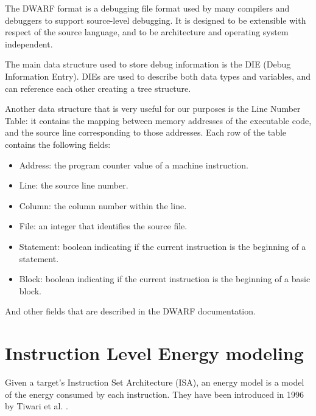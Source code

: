 The DWARF format \cite{dwarf} is a debugging file format used by many compilers and debuggers to support source-level debugging. It is designed to be extensible with respect of the source language, and to be architecture and operating system independent. \par
The main data structure used to store debug information is the DIE (Debug Information Entry). DIEs are used to describe both data types and variables, and can reference each other creating a tree structure. \par
Another data structure that is very useful for our purposes is the Line Number Table: it contains the mapping between memory addresses of the executable code, and the source line corresponding to those addresses.\newline
Each row of the table contains the following fields:
\begin{itemize}
\item Address: the program counter value of a machine instruction.
\item Line: the source line number.
\item Column: the column number within the line.
\item File: an integer that identifies the source file.
\item Statement: boolean indicating if the current instruction is the beginning of a statement.
\item Block: boolean indicating if the current instruction is the beginning of a basic block.
\end{itemize}
And other fields that are described in the DWARF documentation.



\section{Instruction Level Energy modeling}
Given a target's Instruction Set Architecture (ISA), an energy model is a model of the energy consumed by each instruction.
They have been introduced in 1996 by Tiwari et al. \cite{tiwari}. 
